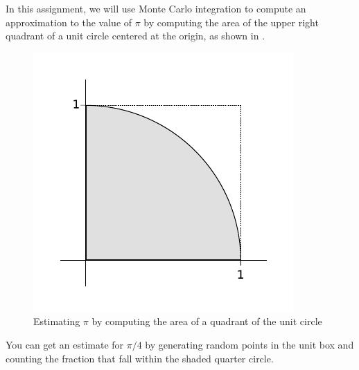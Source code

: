 %
%
%
%

\pagestyle{headandfoot}
\runningfootrule
{}
\runningheader{}{}{}
\firstpagefooter{}{}{}


\def\Li{\mbox{\rm Li}_{2}}
\def\dilog{\mbox{\tt dilog}}

In this assignment, we will use Monte Carlo integration to compute an approximation to the
value of $\pi$ by computing the area of the upper right quadrant of a unit circle centered at
the origin, as shown in .
%
\begin{figure}[h]
\centering
\includegraphics[scale=.75]{figures/pie.pdf}
\caption{Estimating $\pi$ by computing the area of a quadrant of the unit circle
  \label{fig:pie}}
\end{figure}
%

You can get an estimate for $\pi/4$ by generating random points in the unit box and counting
the fraction that fall within the shaded quarter circle.


